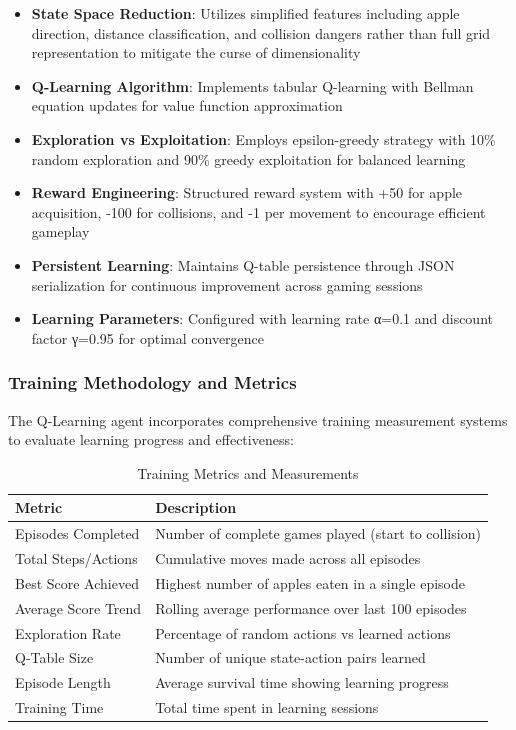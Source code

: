\documentclass[11pt,a4paper]{article}
\begin{document}
\begin{itemize}
\item \textbf{State Space Reduction}: Utilizes simplified features including apple direction, distance classification, and collision dangers rather than full grid representation to mitigate the curse of dimensionality
\item \textbf{Q-Learning Algorithm}: Implements tabular Q-learning with Bellman equation updates for value function approximation
\item \textbf{Exploration vs Exploitation}: Employs epsilon-greedy strategy with 10\% random exploration and 90\% greedy exploitation for balanced learning
\item \textbf{Reward Engineering}: Structured reward system with +50 for apple acquisition, -100 for collisions, and -1 per movement to encourage efficient gameplay
\item \textbf{Persistent Learning}: Maintains Q-table persistence through JSON serialization for continuous improvement across gaming sessions
\item \textbf{Learning Parameters}: Configured with learning rate α=0.1 and discount factor γ=0.95 for optimal convergence
\end{itemize}

\subsubsection{Training Methodology and Metrics}
The Q-Learning agent incorporates comprehensive training measurement systems to evaluate learning progress and effectiveness:

\begin{table}[H]
\centering
\caption{Training Metrics and Measurements}
\begin{tabular}{@{}ll@{}}
\toprule
\textbf{Metric} & \textbf{Description} \\
\midrule
Episodes Completed & Number of complete games played (start to collision) \\
Total Steps/Actions & Cumulative moves made across all episodes \\
Best Score Achieved & Highest number of apples eaten in a single episode \\
Average Score Trend & Rolling average performance over last 100 episodes \\
Exploration Rate & Percentage of random actions vs learned actions \\
Q-Table Size & Number of unique state-action pairs learned \\
Episode Length & Average survival time showing learning progress \\
Training Time & Total time spent in learning sessions \\
\bottomrule
\end{tabular}
\end{table}
\end{document}
